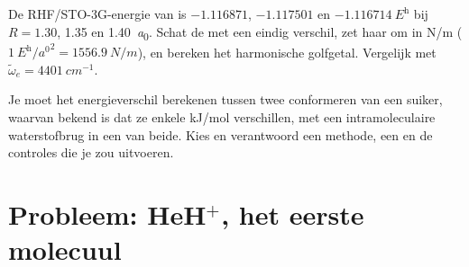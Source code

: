 \begin{exercise}[$\star\star\star$]\label{exo:b3:computational-chemistry:11}
De RHF/STO-3G-energie van  is $-1.116871$, $-1.117501$ en
$\qty{-1.116714}{\hartree}$ bij $R = 1.30$, 1.35 en \qty{1.40}{\bohr}. Schat
de  met een eindig verschil, zet haar om in \unit{N/m}
($\qty{1}{\hartree\per\bohr\squared} = \qty{1556.9}{N/m}$), en bereken het
harmonische golfgetal. Vergelijk met $\tilde\omega_e = \qty{4401}{cm^{-1}}$.
\end{exercise}

\begin{exercise}[$\star\star\star$]\label{exo:b3:computational-chemistry:12}
Je moet het energieverschil berekenen tussen twee conformeren van een
suiker, waarvan bekend is dat ze enkele \unit{kJ/mol} verschillen, met
een intramoleculaire waterstofbrug in een van beide. Kies en verantwoord
een methode, een  en de controles die je zou uitvoeren.
\end{exercise}

\section{Probleem: HeH\texorpdfstring{$^+$}{+}, het eerste molecuul}

